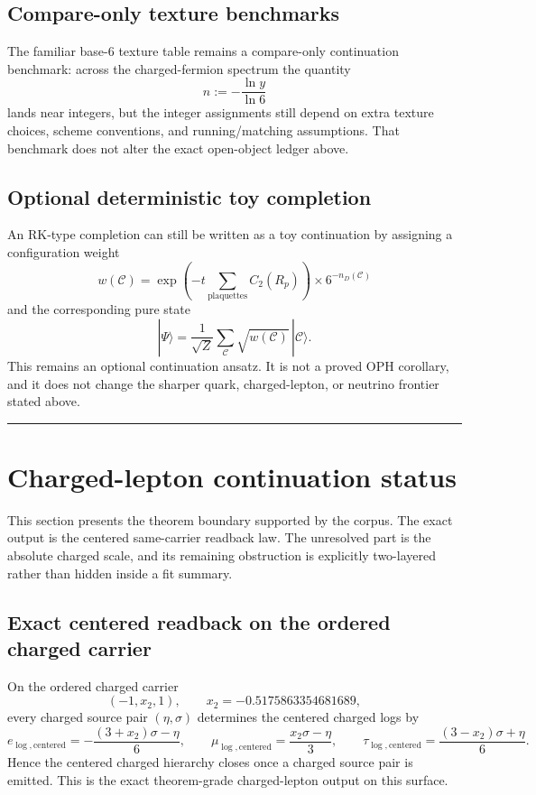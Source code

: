 \subsection{Compare-only texture benchmarks}\label{123-the-yukawa-spectrum}

The familiar base-6 texture table remains a compare-only continuation benchmark: across the charged-fermion spectrum the quantity
\[
n:=-\frac{\ln y}{\ln 6}
\]
lands near integers, but the integer assignments still depend on extra texture choices, scheme conventions, and running/matching assumptions. That benchmark does not alter the exact open-object ledger above.

\subsection{Optional deterministic toy completion}\label{124-deterministic-completion-rk-hamiltonian}

An RK-type completion can still be written as a toy continuation by assigning a configuration weight
\[
w(\mathcal C)=\exp\!\left(-t\sum_{\text{plaquettes}}C_2(R_p)\right)\times 6^{-n_D(\mathcal C)}
\]
and the corresponding pure state
\[
|\Psi\rangle
=
\frac{1}{\sqrt Z}\sum_{\mathcal C}\sqrt{w(\mathcal C)}\,|\mathcal C\rangle.
\]
This remains an optional continuation ansatz. It is not a proved OPH corollary, and it does not change the sharper quark, charged-lepton, or neutrino frontier stated above.

\begin{center}\rule{0.5\linewidth}{0.5pt}\end{center}
\section{Charged-lepton continuation status}\label{13-the-koide-formula}

This section presents the theorem boundary supported by the corpus. The exact output is the centered same-carrier readback law. The unresolved part is the absolute charged scale, and its remaining obstruction is explicitly two-layered rather than hidden inside a fit summary.

\subsection{Exact centered readback on the ordered charged carrier}\label{131-numerical-verification}

On the ordered charged carrier
\[
(-1,x_2,1),
\qquad
x_2=-0.5175863354681689,
\]
every charged source pair \((\eta,\sigma)\) determines the centered charged logs by
\[
e_{\log,\mathrm{centered}}
=
-\frac{(3+x_2)\sigma-\eta}{6},
\qquad
\mu_{\log,\mathrm{centered}}
=
\frac{x_2\sigma-\eta}{3},
\qquad
\tau_{\log,\mathrm{centered}}
=
\frac{(3-x_2)\sigma+\eta}{6}.
\]
Hence the centered charged hierarchy closes once a charged source pair is emitted. This is the exact theorem-grade charged-lepton output on this surface.

